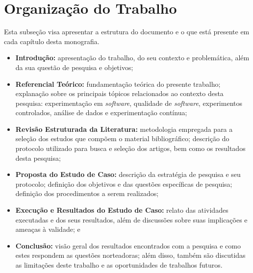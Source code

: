 \section{Organização do Trabalho}
\label{sec:organizacao}

Esta subseção visa apresentar a estrutura do documento e o que está presente em cada capítulo desta monografia.

\begin{itemize}
    \item \textbf{Introdução:} apresentação do trabalho, do seu contexto e problemática, além da sua questão de pesquisa e objetivos;
    \item \textbf{Referencial Teórico:} fundamentação teórica do presente trabalho; explanação sobre os principais tópicos relacionados ao contexto desta pesquisa: experimentação em \textit{software}, qualidade de \textit{software}, experimentos controlados, análise de dados e experimentação contínua;
    \item \textbf{Revisão Estruturada da Literatura:} metodologia empregada para a seleção dos estudos que compõem o material bibliográfico; descrição do protocolo utilizado para busca e seleção dos artigos, bem como os resultados desta pesquisa;
    \item \textbf{Proposta do Estudo de Caso:} descrição da estratégia de pesquisa e seu protocolo; definição dos objetivos e das questões específicas de pesquisa; definição dos procedimentos a serem realizados;
    \item \textbf{Execução e Resultados do Estudo de Caso:} relato das atividades executadas e dos seus resultados, além de discussões sobre suas implicações e ameaças à validade; e
    \item \textbf{Conclusão:} visão geral dos resultados encontrados com a pesquisa e como estes respondem as questões norteadoras; além disso, também são discutidas as limitações deste trabalho e as oportunidades de trabalhos futuros.
\end{itemize}

\pagebreak